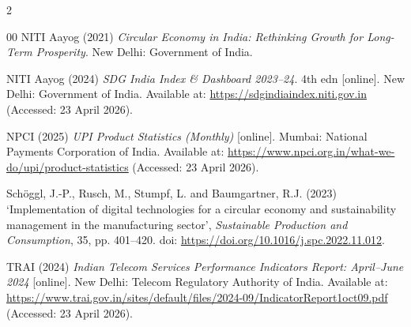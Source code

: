 \documentclass[10pt,a4paper]{article}
\begin{document}
\begin{spacing}{2}
\begin{thebibliography}{00}
NITI Aayog (2021) \textit{Circular Economy in India: Rethinking Growth for Long-Term Prosperity}. New Delhi: Government of India.

NITI Aayog (2024) \textit{SDG India Index \& Dashboard 2023--24}. 4th edn [online]. New Delhi: Government of India. Available at: \url{https://sdgindiaindex.niti.gov.in} (Accessed: 23 April 2026).

NPCI (2025) \textit{UPI Product Statistics (Monthly)} [online]. Mumbai: National Payments Corporation of India. Available at: \url{https://www.npci.org.in/what-we-do/upi/product-statistics} (Accessed: 23 April 2026).

Sch\"oggl, J.-P., Rusch, M., Stumpf, L. and Baumgartner, R.J. (2023) `Implementation of digital technologies for a circular economy and sustainability management in the manufacturing sector', \textit{Sustainable Production and Consumption}, 35, pp. 401--420. doi: \url{https://doi.org/10.1016/j.spc.2022.11.012}.

TRAI (2024) \textit{Indian Telecom Services Performance Indicators Report: April--June 2024} [online]. New Delhi: Telecom Regulatory Authority of India. Available at: \url{https://www.trai.gov.in/sites/default/files/2024-09/IndicatorReport1oct09.pdf} (Accessed: 23 April 2026).

\end{thebibliography}
\end{spacing}
\endgroup
\end{document}

